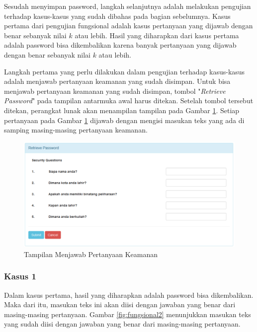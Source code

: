 Sesudah menyimpan password, langkah selanjutnya adalah melakukan pengujian terhadap kasus-kasus yang sudah dibahas pada bagian sebelumnya. Kasus pertama dari pengujian fungsional adalah kasus pertanyaan yang dijawab dengan benar sebanyak nilai $k$ atau lebih. Hasil yang diharapkan dari kasus pertama adalah password bisa dikembalikan karena banyak pertanyaan yang dijawab dengan benar sebanyak nilai $k$ atau lebih.

Langkah pertama yang perlu dilakukan dalam pengujian terhadap kasus-kasus adalah menjawab pertanyaan keamanan yang sudah disimpan. Untuk bisa menjawab pertanyaan keamanan yang sudah disimpan, tombol "\textit{Retrieve Password}" pada tampilan antarmuka awal harus ditekan. Setelah tombol tersebut ditekan, perangkat lunak akan menampilan tampilan pada Gambar \ref{fig:fungsional1}. Setiap pertanyaan pada Gambar \ref{fig:fungsional1} dijawab dengan mengisi masukan teks yang ada di samping masing-masing pertanyaan keamanan.

\begin{figure}[H]
	\includegraphics[scale=0.6]{Gambar/fungsional1}
	\centering
	\caption{Tampilan Menjawab Pertanyaan Keamanan}\label{fig:fungsional1}
\end{figure}

\subsubsection{Kasus 1}

Dalam kasus pertama, hasil yang diharapkan adalah password bisa dikembalikan. Maka dari itu, masukan teks ini akan diisi dengan jawaban yang benar dari masing-masing pertanyaan. Gambar \ref{fig:fungsional2} menunjukkan masukan teks yang sudah diisi dengan jawaban yang benar dari masing-masing pertanyaan.

